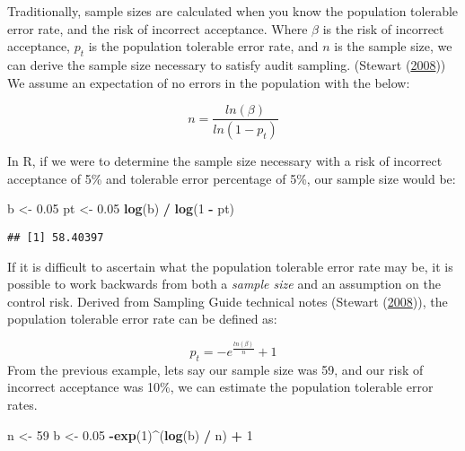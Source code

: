 \documentclass[
]{book}
\newenvironment{Shaded}{\begin{snugshade}}{\end{snugshade}}
\newcommand{\DecValTok}[1]{\textcolor[rgb]{0.00,0.00,0.81}{#1}}
\newcommand{\FloatTok}[1]{\textcolor[rgb]{0.00,0.00,0.81}{#1}}
\newcommand{\KeywordTok}[1]{\textcolor[rgb]{0.13,0.29,0.53}{\textbf{#1}}}
\newcommand{\NormalTok}[1]{#1}
\newcommand{\OperatorTok}[1]{\textcolor[rgb]{0.81,0.36,0.00}{\textbf{#1}}}
\newcommand{\StringTok}[1]{\textcolor[rgb]{0.31,0.60,0.02}{#1}}
\begin{document}
Traditionally, sample sizes are calculated when you know the population tolerable error rate, and the risk of incorrect acceptance. Where \(\beta\) is the risk of incorrect acceptance, \(p_{t}\) is the population tolerable error rate, and \(n\) is the sample size, we can derive the sample size necessary to satisfy audit sampling. (Stewart (\protect\hyperlink{ref-sampling-technical}{2008})) We assume an expectation of no errors in the population with the below:

\[
n = \frac{ln(\beta)}{ln(1 - p_{t})}
\]

In R, if we were to determine the sample size necessary with a risk of incorrect acceptance of 5\% and tolerable error percentage of 5\%, our sample size would be:

\begin{Shaded}
\begin{Highlighting}[]
\NormalTok{b <-}\StringTok{ }\FloatTok{0.05}
\NormalTok{pt <-}\StringTok{ }\FloatTok{0.05}
\KeywordTok{log}\NormalTok{(b) }\OperatorTok{/}\StringTok{ }\KeywordTok{log}\NormalTok{(}\DecValTok{1} \OperatorTok{-}\StringTok{ }\NormalTok{pt)}
\end{Highlighting}
\end{Shaded}

\begin{verbatim}
## [1] 58.40397
\end{verbatim}

If it is difficult to ascertain what the population tolerable error rate may be, it is possible to work backwards from both a \emph{sample size} and an assumption on the control risk. Derived from Sampling Guide technical notes (Stewart (\protect\hyperlink{ref-sampling-technical}{2008})), the population tolerable error rate can be defined as:

\[
p_{t} = -e^\frac{ln(\beta)}{n} + 1
\]
From the previous example, lets say our sample size was 59, and our risk of incorrect acceptance was 10\%, we can estimate the population tolerable error rates.

\begin{Shaded}
\begin{Highlighting}[]
\NormalTok{n <-}\StringTok{ }\DecValTok{59}
\NormalTok{b <-}\StringTok{ }\FloatTok{0.05}
\OperatorTok{-}\KeywordTok{exp}\NormalTok{(}\DecValTok{1}\NormalTok{)}\OperatorTok{^}\NormalTok{(}\KeywordTok{log}\NormalTok{(b) }\OperatorTok{/}\StringTok{ }\NormalTok{n) }\OperatorTok{+}\StringTok{ }\DecValTok{1}
\end{Highlighting}
\end{Shaded}
\end{document}

